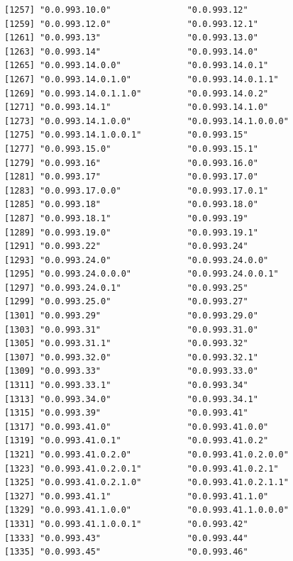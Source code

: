 \documentclass[
  letterpaper,
  DIV=11,
  numbers=noendperiod]{scrreprt}
\begin{document}
\begin{verbatim}
[1257] "0.0.993.10.0"               "0.0.993.12"                
[1259] "0.0.993.12.0"               "0.0.993.12.1"              
[1261] "0.0.993.13"                 "0.0.993.13.0"              
[1263] "0.0.993.14"                 "0.0.993.14.0"              
[1265] "0.0.993.14.0.0"             "0.0.993.14.0.1"            
[1267] "0.0.993.14.0.1.0"           "0.0.993.14.0.1.1"          
[1269] "0.0.993.14.0.1.1.0"         "0.0.993.14.0.2"            
[1271] "0.0.993.14.1"               "0.0.993.14.1.0"            
[1273] "0.0.993.14.1.0.0"           "0.0.993.14.1.0.0.0"        
[1275] "0.0.993.14.1.0.0.1"         "0.0.993.15"                
[1277] "0.0.993.15.0"               "0.0.993.15.1"              
[1279] "0.0.993.16"                 "0.0.993.16.0"              
[1281] "0.0.993.17"                 "0.0.993.17.0"              
[1283] "0.0.993.17.0.0"             "0.0.993.17.0.1"            
[1285] "0.0.993.18"                 "0.0.993.18.0"              
[1287] "0.0.993.18.1"               "0.0.993.19"                
[1289] "0.0.993.19.0"               "0.0.993.19.1"              
[1291] "0.0.993.22"                 "0.0.993.24"                
[1293] "0.0.993.24.0"               "0.0.993.24.0.0"            
[1295] "0.0.993.24.0.0.0"           "0.0.993.24.0.0.1"          
[1297] "0.0.993.24.0.1"             "0.0.993.25"                
[1299] "0.0.993.25.0"               "0.0.993.27"                
[1301] "0.0.993.29"                 "0.0.993.29.0"              
[1303] "0.0.993.31"                 "0.0.993.31.0"              
[1305] "0.0.993.31.1"               "0.0.993.32"                
[1307] "0.0.993.32.0"               "0.0.993.32.1"              
[1309] "0.0.993.33"                 "0.0.993.33.0"              
[1311] "0.0.993.33.1"               "0.0.993.34"                
[1313] "0.0.993.34.0"               "0.0.993.34.1"              
[1315] "0.0.993.39"                 "0.0.993.41"                
[1317] "0.0.993.41.0"               "0.0.993.41.0.0"            
[1319] "0.0.993.41.0.1"             "0.0.993.41.0.2"            
[1321] "0.0.993.41.0.2.0"           "0.0.993.41.0.2.0.0"        
[1323] "0.0.993.41.0.2.0.1"         "0.0.993.41.0.2.1"          
[1325] "0.0.993.41.0.2.1.0"         "0.0.993.41.0.2.1.1"        
[1327] "0.0.993.41.1"               "0.0.993.41.1.0"            
[1329] "0.0.993.41.1.0.0"           "0.0.993.41.1.0.0.0"        
[1331] "0.0.993.41.1.0.0.1"         "0.0.993.42"                
[1333] "0.0.993.43"                 "0.0.993.44"                
[1335] "0.0.993.45"                 "0.0.993.46"                

\end{verbatim}
\end{document}
